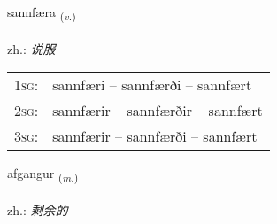 \documentclass[frontgrid, backgrid]{flacards}\usepackage[]{graphicx}\usepackage[]{xcolor}
\begin{document}
\renewcommand{\flhead}{\vskip5pt \fboxsep=0pt {\small\bfseries\footnotesize Sagnorð | 动词}}
\renewcommand{\fcfoot}{\vskip5pt \fboxsep=0pt \hspace{2pt}{\small\bfseries\footnotesize 3K}}

\renewcommand{\blhead}{\vskip5pt {\small\bfseries\footnotesize Sagnorð | 动词 }}
\renewcommand{\bcfoot}{\vskip5pt \hspace{2pt}{\small\bfseries\footnotesize 3K}}


{sannfæra \small{\textsubscript{(\textit{v.})}} \\[1ex] %
\textphonetic{[sanfaira]} \\
zh.: \emph{说服} \\  [2ex]
\renewcommand*{\arraystretch}{0.8}
\begin{tabular}{p{1cm}l}
\textsc{1sg}: & sannfæri -- sannfærði -- sannfært \\ 
\textsc{2sg}: & sannfærir -- sannfærðir -- sannfært \\ 
\textsc{3sg}: & sannfærir -- sannfærði -- sannfært \\ 
\end{tabular}
}

\renewcommand{\flhead}{\vskip5pt \fboxsep=0pt {\small\bfseries\footnotesize Nafnorð | 名词}}
\renewcommand{\fcfoot}{\vskip5pt \fboxsep=0pt \hspace{2pt}{\small\bfseries\footnotesize 3K}}

\renewcommand{\blhead}{\vskip5pt {\small\bfseries\footnotesize Nafnorð | 名词 }}
\renewcommand{\bcfoot}{\vskip5pt \hspace{2pt}{\small\bfseries\footnotesize 3K}}


{afgangur \small{\textsubscript{(\textit{m.})}} \\[1ex] %
\textphonetic{[avkauŋkʏr]} \\
zh.: \emph{剩余的} \\  [2ex]
\renewcommand*{\arraystretch}{0.8}
}
\end{document}
